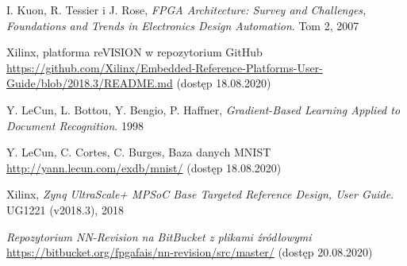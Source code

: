 \documentclass[12pt, oneside, a4paper]{article}
\begin{document}
\begin{thebibliography}{9}
  \raggedright{}

    I. Kuon, R. Tessier i J. Rose,
    \emph{FPGA Architecture: Survey and Challenges, Foundations
    and Trends\textregistered{} in Electronics Design Automation}.
    Tom 2,
    2007

    Xilinx,
    platforma reVISION w repozytorium GitHub \linebreak
    \url{https://github.com/Xilinx/Embedded-Reference-Platforms-User-Guide/blob/2018.3/README.md}
    (dostęp 18.08.2020)
    
  Y. LeCun, L. Bottou, Y. Bengio, P. Haffner,
  \emph{Gradient-Based Learning Applied to Document Recognition}.
  1998

  Y. LeCun, C. Cortes, C. Burges,
  Baza danych MNIST
  \url{http://yann.lecun.com/exdb/mnist/}
  (dostęp 18.08.2020)

  Xilinx,
  \emph{Zynq UltraScale+ MPSoC Base Targeted Reference Design, User Guide}.
  UG1221 (v2018.3),
  2018

  \emph{Repozytorium NN-Revision na BitBucket z plikami źródłowymi} \linebreak
  \url{https://bitbucket.org/fpgafais/nn-revision/src/master/}
  (dostęp 20.08.2020)
  
\end{thebibliography}
\end{document}
